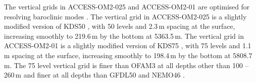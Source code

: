 \documentclass[11pt]{article}
\begin{document}
The vertical grids in ACCESS-OM2-025 and ACCESS-OM2-01 are optimised for resolving baroclinic modes \citep{StewartHoggGriffiesHeerdegenWardSpenceEngland2017a}.
The vertical grid in ACCESS-OM2-025 is a slightly modified version of KDS50 \citep[][table~1]{StewartHoggGriffiesHeerdegenWardSpenceEngland2017a}, with 50 levels and 2.3\,m spacing at the surface, increasing smoothly to 219.6\,m by the bottom at 5363.5\,m.
The vertical grid in ACCESS-OM2-01 is a slightly modified version of KDS75 \citep[][table~1]{StewartHoggGriffiesHeerdegenWardSpenceEngland2017a}, with 75 levels and 1.1\,m spacing at the surface, increasing smoothly to 198.4\,m by the bottom at 5808.7\,m.
The 75 level vertical grid is finer than OFAM3 at all depths other than 100 -- 260\,m and finer at all depths than GFDL50 and NEMO46 \citep[as defined by][]{StewartHoggGriffiesHeerdegenWardSpenceEngland2017a}.
\end{document}

